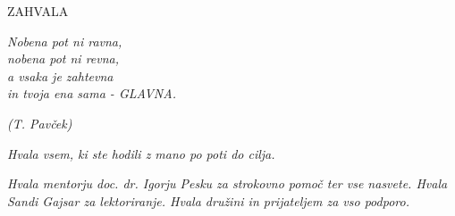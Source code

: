 
  \begin{center}
    \Large
    ZAHVALA
  \end{center}

  \vspace{1cm}

  \begin{minipage}[t]{0.35\textwidth}
  \textit{
    Nobena pot ni ravna,\\
    nobena pot ni revna,\\
    a vsaka je zahtevna\\
    in tvoja ena sama - GLAVNA.
  }  
    \begin{flushright}
      \textit{(T. Pavček)}
    \end{flushright}  
  
  \end{minipage}

  \vspace{1cm}

  \begin{sloppypar}
    \textit{Hvala vsem, ki ste hodili z mano po poti do cilja.}
  \end{sloppypar}

  \vspace{1cm}

  \begin{sloppypar}
    \textit{Hvala mentorju doc. dr. Igorju Pesku za strokovno pomoč ter vse nasvete. Hvala
      Sandi Gajsar za lektoriranje. Hvala družini in prijateljem za vso
      podporo.} 
  \end{sloppypar}

  \vfill

